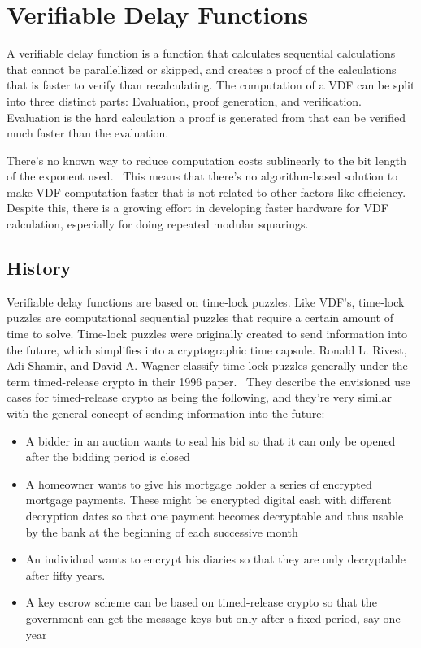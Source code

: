 \chapter{Verifiable Delay Functions}
\label{Verifiable Delay Functions}

A verifiable delay function is a function that calculates sequential calculations that cannot be parallellized or skipped, and creates a proof of the calculations that is faster to verify than recalculating. The computation of a VDF can be split into three distinct parts: Evaluation, proof generation, and verification. Evaluation is the hard calculation a proof is generated from that can be verified much faster than the evaluation.

There's no known way to reduce computation costs sublinearly to the bit length of the exponent used.~\cite{Boneh2018-sm} This means that there's no algorithm-based solution to make VDF computation faster that is not related to other factors like efficiency. Despite this, there is a growing effort in developing faster hardware for VDF calculation, especially for doing repeated modular squarings.

\section{History}
Verifiable delay functions are based on time-lock puzzles. Like VDF's, time-lock puzzles are computational sequential puzzles that require a certain amount of time to solve.\cite{Rivest_undated-qr} Time-lock puzzles were originally created to send information into the future, which simplifies into a cryptographic time capsule. Ronald L. Rivest, Adi Shamir, and David A. Wagner classify time-lock puzzles generally under the term timed-release crypto in their 1996 paper.~\cite{Rivest_undated-qr} They describe the envisioned use cases for timed-release crypto as being the following, and they're very similar with the general concept of sending information into the future:

\begin{itemize}
  \item A bidder in an auction wants to seal his bid so that it can only be opened after the bidding period is closed 
  \item A homeowner wants to give his mortgage holder a series of encrypted mortgage payments. These might be encrypted digital cash with different decryption dates so that one payment becomes decryptable and thus usable by the bank at the beginning of each successive month
  \item An individual wants to encrypt his diaries so that they are only decryptable after fifty years.
  \item A key escrow scheme can be based on timed-release crypto so that the government can get the message keys but only after a fixed period, say one year
\end{itemize}

